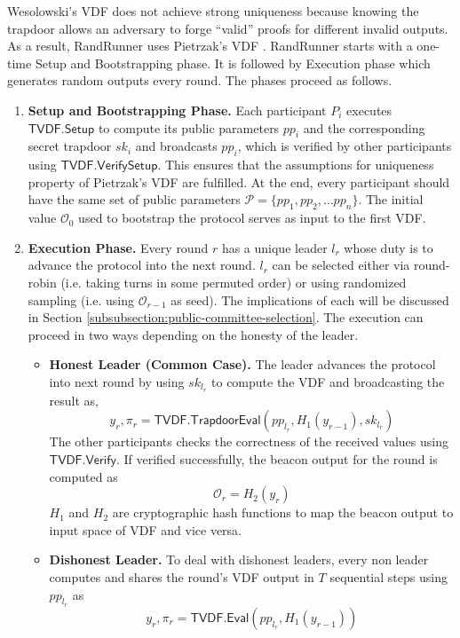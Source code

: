 \documentclass[letterpaper,twocolumn,10pt]{article}
\theoremstyle{definition}
\theoremstyle{remark}
\begin{document}
Wesolowski’s VDF \cite{wesolowski2019efficient} does not achieve strong uniqueness because knowing the trapdoor allows an adversary to forge ``valid'' proofs for different invalid outputs. As a result, RandRunner uses Pietrzak's VDF \cite{pietrzak2018simple}. RandRunner starts with a one-time Setup and Bootstrapping phase. It is followed by Execution phase which generates random outputs every round. The phases proceed as follows.
\begin{enumerate}
    \item \textbf{Setup and Bootstrapping Phase.} Each participant $P_i$ executes $\mathsf{TVDF.Setup}$ to compute its public parameters $pp_i$ and the corresponding secret trapdoor $sk_i$ and broadcasts $pp_i$, which is verified by other participants using $\mathsf{TVDF.VerifySetup}$. This ensures that the assumptions for uniqueness property of Pietrzak’s VDF \cite{pietrzak2018simple} are fulfilled. At the end, every participant should have the same set of public parameters $\mathcal{P} = \{ pp_1, pp_2, \ldots pp_n \}$. The initial value $\mathcal{O}_0$ used to bootstrap the protocol serves as input to the first VDF.
    
    \item \textbf{Execution Phase.} Every round $r$ has a unique leader $l_r$ whose duty is to advance the protocol into the next round. $l_r$ can be selected either via round-robin (i.e. taking turns in some permuted order) or using randomized sampling (i.e. using $\mathcal{O}_{r-1}$ as seed). The implications of each will be discussed in Section \ref{subsubsection:public-committee-selection}. The execution can proceed in two ways depending on the honesty of the leader.
    \begin{itemize}
        \item \textbf{Honest Leader (Common Case).} The leader advances the protocol into next round by using $sk_{l_r}$ to compute the VDF and broadcasting the result as,
        $$y_r, \pi_r = \mathsf{TVDF.TrapdoorEval}(pp_{l_r}, H_1(y_{r-1}), sk_{l_r})$$
        The other participants checks the correctness of the received values using $\mathsf{TVDF.Verify}$. If verified successfully, the beacon output for the round is computed as 
        $$\mathcal{O}_r = H_2(y_r)$$
        $H_1$ and $H_2$ are cryptographic hash functions to map the beacon output to input space of VDF and vice versa.
        \item \textbf{Dishonest Leader.} To deal with dishonest leaders, every non leader computes and shares the round's VDF output in $T$ sequential steps using $pp_{l_r}$ as
        $$y_r, \pi_r = \mathsf{TVDF.Eval}(pp_{l_r}, H_1(y_{r-1}))$$
    \end{itemize}
\end{enumerate}
\end{document}
